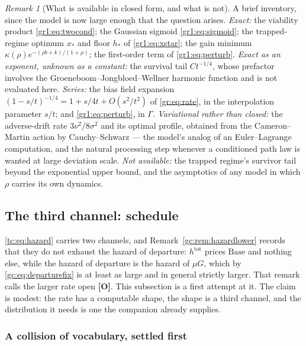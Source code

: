 \documentclass[11pt]{article}
\numberwithin{equation}{section}
\theoremstyle{plain}
\theoremstyle{definition}
\theoremstyle{remark}
\newtheorem{remark}[theorem]{Remark}
\begin{document}
\begin{remark}[What is available in closed form, and what is not]
\label{gr1:rem:closedform}
A brief inventory, since the model is now large enough that the question
arises. \emph{Exact:} the viability product \eqref{gr1:eq:twocond}; the
Gaussian sigmoid \eqref{gr1:eq:sigmoid}; the trapped-regime optimum
$x_\ast$ and floor $h_\ast$ of \eqref{gr1:eq:xstar}; the gain minimum
$\kappa(\rho)e^{-(\rho b+k)/(1+\rho)}$; the first-order term of
\eqref{gr1:eq:perturb}. \emph{Exact as an exponent, unknown as a
constant:} the survival tail $Ct^{-1/4}$, whose prefactor involves the
Groeneboom--Jongbloed--Wellner harmonic function and is not evaluated
here. \emph{Series:} the bias field expansion
$(1-s/t)^{-1/4}=1+s/4t+O(s^2/t^2)$ of \eqref{gr:eq:rate}, in the
interpolation parameter $s/t$; and \eqref{gr1:eq:perturb}, in $\Gamma$.
\emph{Variational rather than closed:} the adverse-drift rate
$3\nu^{2}/8\sigma^{2}$ and its optimal profile, obtained from the
Cameron--Martin action by Cauchy--Schwarz --- the model's analog of an
Euler--Lagrange computation, and the natural processing step whenever a
conditioned path law is wanted at large deviation scale.
\emph{Not available:} the trapped regime's survivor tail beyond the
exponential upper bound, and the asymptotics of any model in which
$\rho$ carries its own dynamics.
\end{remark}

\subsection{The third channel: schedule}\label{sch:sub:schedule}

\eqref{tc:eq:hazard} carries two channels, and
Remark~\ref{gc:rem:hazardlower} records that they do not exhaust the
hazard of departure: $h^{\mathrm{tot}}$ prices $\mathrm{Base}$ and
nothing else, while the hazard of departure is the hazard of $\mu G$,
which by \eqref{gc:eq:departurefix} is at least as large and in general
strictly larger. That remark calls the larger rate open \textbf{[O]}. This subsection is a first attempt at it. The claim is modest: the rate
has a computable shape, the shape is a third channel, and the
distribution it needs is one the companion already supplies.

\subsubsection{A collision of vocabulary, settled first}
\label{sch:subsub:vocab}
\end{document}
